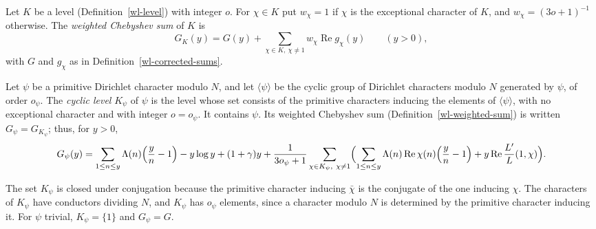 \begin{definition}\label{wl-weighted-sum}
Let $K$ be a level (Definition~\ref{wl-level}) with integer $o$. For
$\chi\in K$ put $w_\chi=1$ if $\chi$ is the exceptional character of $K$, and
$w_\chi=(3o+1)^{-1}$ otherwise. The \emph{weighted Chebyshev sum} of $K$ is
\[
 G_K(y)=G(y)+\sum_{\chi\in K,\ \chi\neq1}w_\chi\operatorname{Re}g_\chi(y)
 \qquad(y>0),
\]
with $G$ and $g_\chi$ as in Definition~\ref{wl-corrected-sums}.
\end{definition}

\begin{definition}\label{wl-cyclic-level}
Let $\psi$ be a primitive Dirichlet character modulo $N$, and let
$\langle\psi\rangle$ be the cyclic group of Dirichlet characters modulo $N$
generated by $\psi$, of order $o_\psi$. The \emph{cyclic level} $K_\psi$ of
$\psi$ is the level whose set consists of the primitive characters inducing
the elements of $\langle\psi\rangle$, with no exceptional character and with
integer $o=o_\psi$. It contains $\psi$. Its weighted Chebyshev sum
(Definition~\ref{wl-weighted-sum}) is written $G_\psi=G_{K_\psi}$; thus, for
$y>0$,
\[
 G_\psi(y)=\sum_{1\leq n\leq y}\Lambda(n)\Bigl(\frac yn-1\Bigr)-y\log y+(1+\gamma)y
 +\frac{1}{3o_\psi+1}\sum_{\chi\in K_\psi,\ \chi\neq1}
 \Bigl(\sum_{1\leq n\leq y}\Lambda(n)\operatorname{Re}\chi(n)\Bigl(\frac yn-1\Bigr)
 +y\operatorname{Re}\frac{L'}{L}(1,\chi)\Bigr).
\]
\end{definition}

The set $K_\psi$ is closed under conjugation because the primitive character
inducing $\bar\chi$ is the conjugate of the one inducing $\chi$. The
characters of $K_\psi$ have conductors dividing $N$, and $K_\psi$ has $o_\psi$
elements, since a character modulo $N$ is determined by the primitive
character inducing it. For $\psi$ trivial, $K_\psi=\{1\}$ and $G_\psi=G$.

